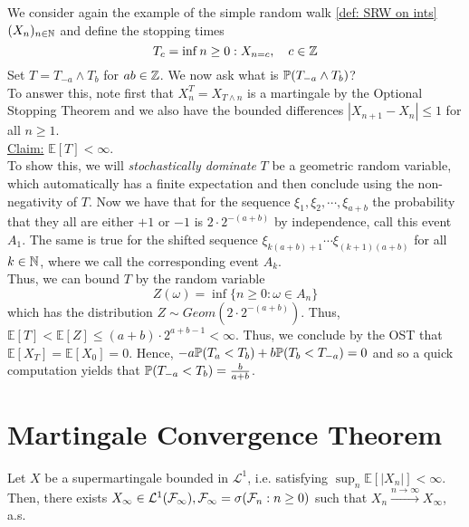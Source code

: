 \documentclass{article}
\begin{document}
 We consider again the example of the simple random walk \ref{def: SRW on ints} $ (X_{n})_{n\in \mathbb{N}}$ and define the stopping times 
\[
	T_{c} = \displaystyle\inf {n\geq 0: X_{n = c}}, \quad c\in \mathbb{Z}
\]
Set $ T = T_{-a}\land T_{b}$ for $ a b \in \mathbb{Z}$. We now ask what is $ \mathbb{P}(T_{-a}\land T_{b})$?\\ 

To answer this, note first that $ X^{T}_{n} = X_{T\land n}$ is a martingale by the Optional Stopping Theorem and we also have the bounded differences $ |X_{n+1}-X_{n}|\leq 1$ for all $ n\geq 1$.\\ 

\underline{Claim:} $\mathbb{E}[T]<\infty$.\\ 
To show this, we will \textit{stochastically dominate} $ T$ be a geometric random variable, which automatically has a finite expectation and then conclude using the non-negativity of $ T$. Now we have that for the sequence $ \xi_{1}, \xi_{2}, \cdots, \xi_{a+b}$ the probability that they all are either $ +1$ or $ -1$ is $ 2\cdot 2^{-(a+b)}$ by independence, call this event $ A_1$. The same is true for the shifted sequence $ \xi_{k(a+b)+1}\cdots \xi_{(k+1)(a+b)}$ for all $ k\in \mathbb{N}$, where we call the corresponding event $ A_{k}$.  \\ 

Thus, we can bound $ T$ by the random variable
\[
	Z(\omega) =\displaystyle\inf\{n\geq 0: \omega \in A_{n}\}  
\]
which has the distribution $ Z\sim Geom(2\cdot2^{-(a+b)})$. Thus, $\mathbb{E}[T]<\mathbb{E}[Z]\leq (a+b)\cdot 2^{a+b-1}<\infty$. Thus, we conclude by the OST that $\mathbb{E}[X_{T}]=\mathbb{E}[X_{0}]=0$. Hence, $ -a\mathbb{P}(T_{a}<T_{b})+b\mathbb{P}(T_{b}<T_{-a}) = 0$ and so a quick computation yields that $ \mathbb{P}(T_{-a}<T_{b}) = \frac{b}{a+b}$.\\ 

\section{Martingale Convergence Theorem}\label{sec: mg conv thm discrete case}

\begin{theorem}\label{thm: a.s. mg conv thm disc}
	Let $ X$ be a supermartingale bounded in $ \mathcal{L}^{1}$, i.e. satisfying $\displaystyle \sup_{n}\mathbb{E}[|X_{n}|]<\infty$. Then, there exists $ X_{\infty}\in \mathcal{ L}^{1}(\mathcal{F}_{\infty}), \mathcal{F}_{\infty} = \sigma(\mathcal{F}_{n}: n\geq 0)$ such that $ X_{n}\stackrel{n\to \infty}{\longrightarrow} X_{\infty}$, a.s.
\end{theorem}
\end{document}
